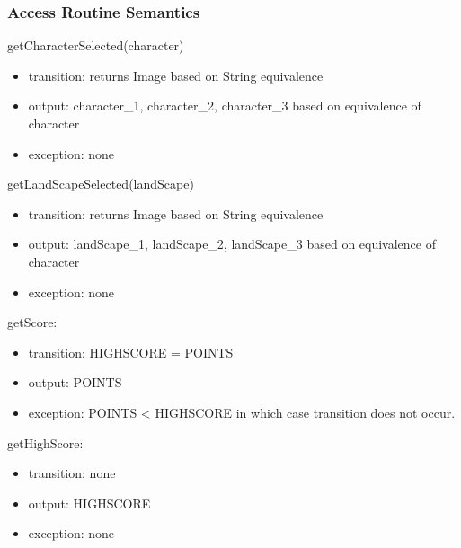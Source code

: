 \documentclass[12pt, titlepage]{article}
\begin{document}
\subsubsection{Access Routine Semantics}
getCharacterSelected(character)
\begin{itemize}
\item transition: returns Image based on String equivalence
\item output:  character\_1, character\_2, character\_3  based on equivalence of character
\item exception: none
\end{itemize}
\noindent getLandScapeSelected(landScape)
\begin{itemize}
\item transition: returns Image based on String equivalence
\item output: landScape\_1, landScape\_2, landScape\_3  based on equivalence of character
\item exception: none
\end{itemize}
\noindent getScore:
\begin{itemize}
\item transition: HIGHSCORE = POINTS
\item output: POINTS
\item exception: POINTS < HIGHSCORE in which case transition does not occur.
\end{itemize}
\noindent getHighScore:
\begin{itemize}
\item transition: none
\item output: HIGHSCORE
\item exception: none
\end{itemize}

\newpage
\end{document}
